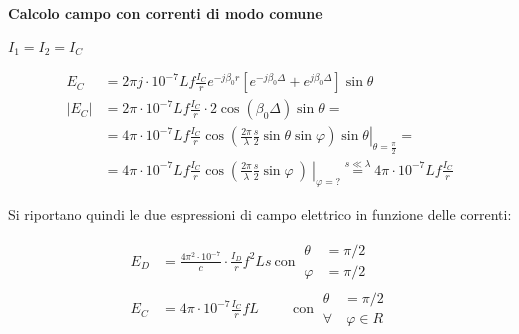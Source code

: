 
\paragraph{Calcolo campo con correnti di modo comune}
$I_1 = I_2 = I_C$

\begin{equation*}
\begin{split}
E_C & = 2 \pi j \cdot 10^{-7} L f \frac{I_C}{r}e^{-j \beta_0 r} \left[e^{-j \beta_0 \Delta} + e^{j \beta_0 \Delta} \right]\sin\theta \\
\left|E_C\right| & = 2 \pi \cdot 10^{-7} L f \frac{I_C}{r} \cdot 2 \cos(\beta_0\Delta)\sin\theta = \\
& = 4\pi\cdot10^{-7}Lf \frac{I_C}{r}\cos\left.\left(\frac{2\pi}{\lambda}\frac{s}{2}\sin\theta\sin\varphi\right)\sin\theta\right|_{\theta=\frac{\pi}{2}} =\\
& = 4\pi\cdot10^{-7}Lf\frac{I_C}{r}\cos\left.\left(\frac{2\pi}{\lambda}\frac{s}{2} \sin\varphi\ \right)\ \right|_{\varphi=?} \stackrel{s\ll\lambda}{=} 4\pi\cdot10^{-7}Lf\frac{I_C}{r}
\end{split}
\end{equation*}

Si riportano quindi le due espressioni di campo elettrico in funzione delle correnti:

\begin{equation*}
 \begin{split}
 E_D & = \frac{4\pi^2\cdot10^{-7}}{c}\cdot \frac{I_D}{r} f^2 Ls\ \text{con}\ \begin{split}
 \theta & = \pi/2 \\
 \varphi & = \pi/2
 \end{split}\\
 E_C & = 4\pi\cdot10^{-7}\frac{I_C}{r}fL\qquad\ \ \text{con}\ \begin{split}
  \theta & = \pi/2 \\
 \forall& \ \varphi\in R
 \end{split}
 \end{split}
\end{equation*}

